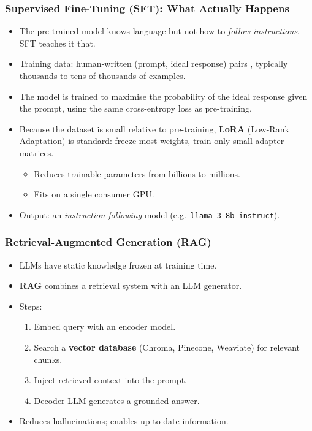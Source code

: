 \begin{frame}[fragile]\frametitle{Supervised Fine-Tuning (SFT): What Actually Happens}
\begin{itemize}
  \item The pre-trained model knows language but not how to
    \emph{follow instructions}. SFT teaches it that.
  \item Training data: human-written (prompt, ideal response) pairs
   , typically thousands to tens of thousands of examples.
  \item The model is trained to maximise the probability of the ideal
    response given the prompt, using the same cross-entropy loss as
    pre-training.
  \item Because the dataset is small relative to pre-training,
    \textbf{LoRA} (Low-Rank Adaptation) is standard: freeze most
    weights, train only small adapter matrices.
    \begin{itemize}
      \item Reduces trainable parameters from billions to millions.
      \item Fits on a single consumer GPU.
    \end{itemize}
  \item Output: an \emph{instruction-following} model (e.g.\
    \texttt{llama-3-8b-instruct}).
\end{itemize}
\end{frame}

\begin{frame}[fragile]\frametitle{Retrieval-Augmented Generation (RAG)}

    \begin{itemize}
    \item LLMs have static knowledge frozen at training time.
    \item \textbf{RAG} combines a retrieval system with an LLM generator.
    \item Steps:
      \begin{enumerate}
      \item Embed query with an encoder model.
      \item Search a \textbf{vector database} (Chroma, Pinecone, Weaviate) for relevant chunks.
      \item Inject retrieved context into the prompt.
      \item Decoder-LLM generates a grounded answer.
      \end{enumerate}
    \item Reduces hallucinations; enables up-to-date information.
    \end{itemize}

\end{frame}



